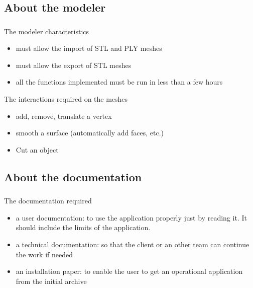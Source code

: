 \documentclass{beamer}
\begin{document}
\subsection{About the modeler}
\begin{frame}
	\frametitle{}
	 \begin{block}{The modeler characteristics}
		\begin{itemize}
			\item must allow the import of STL and PLY meshes
			\item must allow the export of STL meshes
			\item all the functions implemented must be run in less than a few hours
		\end{itemize}
    \end{block}
    
    \begin{block}{The interactions required on the meshes}
		\begin{itemize}
			\item add, remove, translate a vertex
			\item smooth a surface (automatically add faces, etc.)
			\item Cut an object
		\end{itemize}
    \end{block}

\end{frame}

\subsection{About the documentation}
\begin{frame}
	\frametitle{}
	 \begin{block}{The documentation required}
		\begin{itemize}
			\item a user documentation: to use the application properly just by reading it. It should include the limits of the application.
			\item a technical documentation: so that the client or an other team can continue the work if needed
			\item an installation paper: to enable the user to get an operational application from the initial archive
		\end{itemize}
    \end{block}    

\end{frame}
\end{document}
